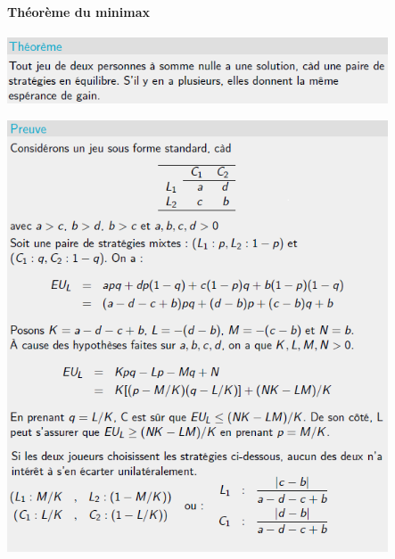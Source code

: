 \documentclass[a4paper, 12pt]{article}
\begin{document}
		\paragraph{Théorème du minimax}
			\begin{center}
				\includegraphics[width=4.45in]{Images/minimax_theoreme}
			\end{center}
			\begin{center}
				\includegraphics[width=4.45in]{Images/minimax_preuve}
			\end{center}
\end{document}
